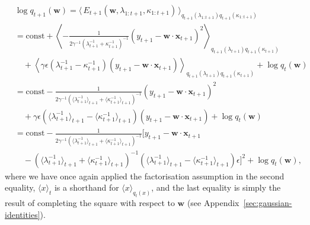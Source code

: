 \begin{align}
\label{eq:pa-var-dist-weights-derivation}
	& \log q_{t+1}(\mathbf{w})
	= \langle\, E_{t+1}(\mathbf{w}, \lambda_{1:t+1}, \kappa_{1:t+1})\,\rangle_{q_{t+1}(\lambda_{1:t+1})q_{t+1}(\kappa_{1:t+1})}
	\nonumber \\
	&=  \text{const} + \left\langle-\frac{1}{2\gamma^{-1}(\lambda_{t+1}^{-1} + \kappa_{t+1}^{-1})^{-1}}(y_{t+1} - \mathbf{w}\cdot\mathbf{x}_{t+1})^2\right\rangle_{q_{t+1}(\lambda_{t+1})q_{t+1}(\kappa_{t+1})} 
	\nonumber \\
	&\quad + \left\langle\gamma\epsilon(\lambda_{t+1}^{-1} - \kappa_{t+1}^{-1})(y_{t+1} - \mathbf{w}\cdot\mathbf{x}_{t+1})\right\rangle_{q_{t+1}(\lambda_{t+1})q_{t+1}(\kappa_{t+1})} + \log q_{t}(\mathbf{w})
	\nonumber \\
	&= \text{const} - \frac{1}{2\gamma^{-1}(\langle\lambda_{t+1}^{-1}\rangle_{t+1} + \langle\kappa_{t+1}^{-1}\rangle_{t+1})^{-1}}(y_{t+1} - \mathbf{w}\cdot\mathbf{x}_{t+1})^2
	\nonumber \\
	&\quad + \gamma\epsilon(\langle\lambda_{t+1}^{-1}\rangle_{t+1} - \langle\kappa_{t+1}^{-1}\rangle_{t+1})(y_{t+1} - \mathbf{w}\cdot\mathbf{x}_{t+1}) + \log q_{t}(\mathbf{w})
	\nonumber \\
	&= \text{const} - \frac{1}{2\gamma^{-1}(\langle\lambda_{t+1}^{-1}\rangle_{t+1} + \langle\kappa_{t+1}^{-1}\rangle_{t+1})^{-1}}
	\big[y_{t+1} - \mathbf{w}\cdot\mathbf{x}_{t+1} 
	\nonumber \\	
	& \quad - (\langle\lambda_{t+1}^{-1}\rangle_{t+1} + \langle\kappa_{t+1}^{-1}\rangle_{t+1})^{-1}(\langle\lambda_{t+1}^{-1}\rangle_{t+1} - \langle\kappa_{t+1}^{-1}\rangle_{t+1})\epsilon\big]^2
	+ \log q_{t}(\mathbf{w}),
\end{align}
where we have once again applied the factorisation assumption in the second equality, $\langle x\rangle_t$ is a shorthand for $\langle x\rangle_{q_{t}(x)}$, and the last equality is simply the result of completing the square with respect to $\mathbf{w}$ (see Appendix~\ref{sec:gaussian-identities}).

